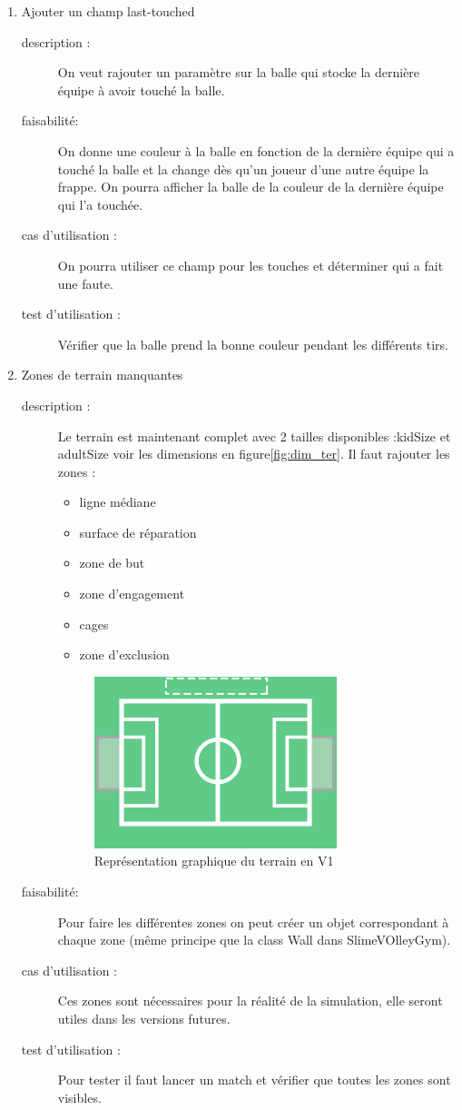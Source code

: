 \documentclass[11pt, a4paper]{article}
\newcommand{\besoinVItem}[5]{
	\item #1
	\begin{description}
		\item[description :]
		#2 
		\item[faisabilité: ]
		#3
		\item[cas d'utilisation :]
		#4
		\item[test d'utilisation :]      
		#5
	\end{description}
}
\begin{document}
\begin{enumerate}
{	}
	{
	Dans les paramètres, l'utilisateur peut choisir l'orientation de l'agent, et sa catégorie.
	}
	{
		Tester si les différentes catégories changent bien l'environnement, vérifier que les agents ne tirent pas de dos avec orientation activée.
	} 

	\besoinVItem{Ajouter un champ last-touched }
	{On veut rajouter un paramètre sur la balle qui stocke la dernière équipe à avoir touché la balle.  }
	
	{On donne une couleur à la balle en fonction de la dernière équipe qui a touché la balle et la change dès qu'un joueur d'une autre équipe la frappe. On pourra afficher la balle de la couleur de la dernière équipe qui l'a touchée.}
	
	{On pourra utiliser ce champ pour les touches et déterminer qui a fait une faute. }
	
	{Vérifier que la balle prend la bonne couleur pendant les différents tirs.}
	
	
	\besoinVItem{Zones de terrain manquantes}
	{ Le terrain est maintenant complet avec 2 tailles disponibles :kidSize et adultSize voir les dimensions en figure\ref{fig:dim_ter}.
		Il faut rajouter les zones : 
	\begin{itemize}
		\item ligne médiane
		\item surface de réparation
		\item zone de but
		\item zone d'engagement
		\item cages
		\item zone d'exclusion
	\end{itemize}

		\begin{figure}[H]
		\centering
		\includegraphics[height=5cm]{images/TerrainV1.png}
		\caption{Représentation graphique du terrain en V1}
		\label{fig:terrain1}
	\end{figure}


	}
	{Pour faire les différentes zones on peut créer un objet correspondant à chaque zone (même principe que la class Wall dans SlimeVOlleyGym).}
	{ Ces zones sont nécessaires pour la réalité de la simulation, elle seront utiles dans les versions futures.}
	{Pour tester il faut lancer un match et vérifier que toutes les zones sont visibles.}


\end{enumerate}
\end{document}
